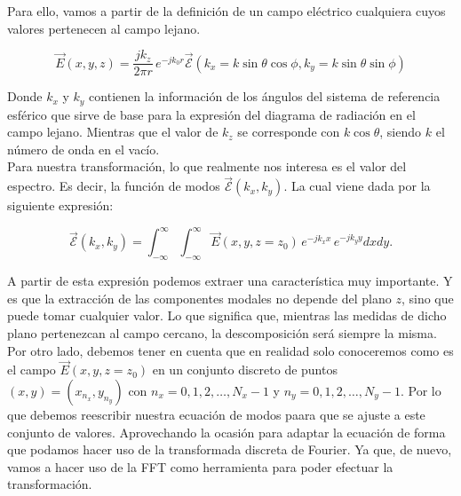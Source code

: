 \documentclass{article}
\begin{document}
Para ello, vamos a partir de la definición de un campo eléctrico cualquiera cuyos valores pertenecen al campo lejano.

\begin{equation}
\vec{E}(x,y,z)=\frac{jk_{z}}{2\pi r}\,e^{-jk_{0}r}{\vec{\mathcal{E}}}(k_{x}=k \sin\theta \cos\phi,k_{y}= k\sin\theta \sin\phi)
\label{NFtoFF:eq-campo-lejano}
\end{equation}

Donde $k_{x}$ y $ k_{y}$  contienen la información de los ángulos del sistema de referencia esférico que sirve de base para la expresión del diagrama de radiación en el campo lejano. Mientras que el valor de $k_{z}$ se corresponde con $k\cos\theta$, siendo $k$ el número de onda en el vacío.
\\

Para nuestra transformación, lo que realmente nos interesa es el valor del espectro. Es decir, la función de modos ${\vec{\mathcal{E}}}(k_{x},k_{y})$. La cual viene dada por la siguiente expresión:

\begin{equation}
{\vec{\mathcal{E}}}(k_{x},k_{y})=\int_{-\infty}^{\infty}\int_{-\infty}^{\infty}\vec{E}(x,y,z=z_{0})\,e^{-j k_{x}x}\,e^{-jk_{y}y} dx dy.
\label{NFtoFF:eq-modos-del-campo-lejano}
\end{equation}
 
A partir de esta expresión podemos extraer una característica muy importante. Y es que la extracción de las componentes modales no depende del plano $z$, sino que puede tomar cualquier valor. Lo que significa que, mientras las medidas de dicho plano pertenezcan al campo cercano, la descomposición será siempre la misma.
\\

Por otro lado, debemos tener en cuenta que en realidad solo conoceremos como es el campo  $\vec{E}(x,y,z=z_{0})$ en un conjunto discreto de puntos $(x,y) = (x_{n_{x}},y_{n_{y}})$ con  $n_{x}=0,1,2,\ldots,N_{x}-1$ y  $n_{y}=0,1,2,\ldots,N_{y}-1$. Por lo que debemos reescribir nuestra ecuación de modos paara que se ajuste a este conjunto de valores. Aprovechando la ocasión para adaptar la ecuación de forma que podamos hacer uso de la transformada discreta de Fourier. Ya que, de nuevo, vamos a hacer uso de la FFT como herramienta para poder efectuar la transformación.
\\
\end{document}
